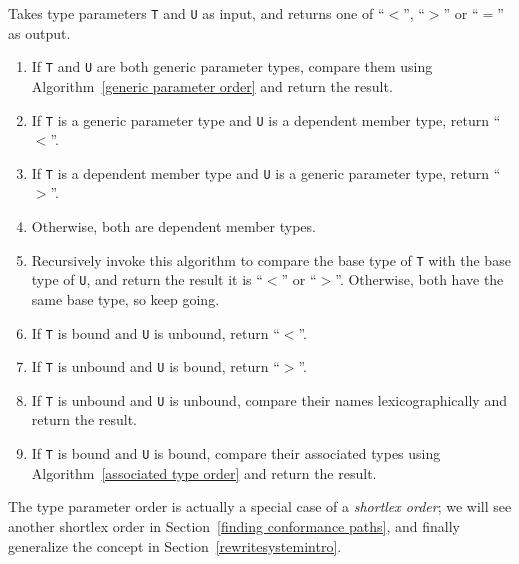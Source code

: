 \documentclass[../generics]{subfiles}
\begin{document}
\begin{algorithm}\label{type parameter order}
Takes type parameters \texttt{T} and \texttt{U} as input, and returns one of ``$<$'', ``$>$'' or ``$=$'' as output.
\begin{enumerate}
\item If \texttt{T} and \texttt{U} are both generic parameter types, compare them using Algorithm~\ref{generic parameter order} and return the result.
\item If \texttt{T} is a generic parameter type and \texttt{U} is a dependent member type, return ``$<$''.
\item If \texttt{T} is a dependent member type and \texttt{U} is a generic parameter type, return ``$>$''.
\item Otherwise, both are dependent member types.
\item Recursively invoke this algorithm to compare the base type of \texttt{T} with the base type of \texttt{U}, and return the result it is ``$<$'' or ``$>$''. Otherwise, both have the same base type, so keep going.
\item If \texttt{T} is bound and \texttt{U} is unbound, return ``$<$''.
\item If \texttt{T} is unbound and \texttt{U} is bound, return ``$>$''.
\item If \texttt{T} is unbound and \texttt{U} is unbound, compare their names lexicographically and return the result.
\item If \texttt{T} is bound and \texttt{U} is bound, compare their associated types using Algorithm~\ref{associated type order} and return the result.
\end{enumerate}
\end{algorithm}
The type parameter order is actually a special case of a \emph{shortlex order}; we will see another shortlex order in Section~\ref{finding conformance paths}, and finally generalize the concept in Section~\ref{rewritesystemintro}.
\end{document}
